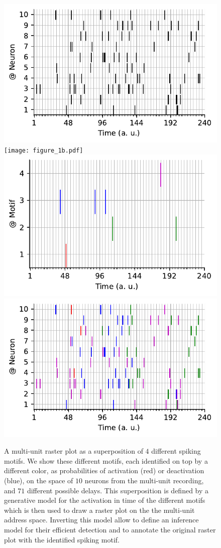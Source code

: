 \documentclass[11pt]{article}
\begin{document}
\begin{figure}[h!]%
    \includegraphics[width=.245\linewidth]{figure_1a_k.pdf}
    \texttt{[image: figure\_1b.pdf]}
  \includegraphics[width=.245\linewidth]{figure_1c.pdf}
    \includegraphics[width=.245\linewidth]{figure_1a.pdf}
{
\caption{A multi-unit raster plot as a superposition of $4$ different spiking motifs. We show these different motifs, each identified on top by a different color, as probabilities of activation (red) or deactivation (blue), on the space of $10$ neurons from the multi-unit recording, and $71$ different possible delays. This superposition is defined by a generative model for the activation in time of the different motifs which is then used to draw a raster plot on the the multi-unit address space. Inverting this model allow to define an inference model for their efficient detection and to annotate the original raster plot with the identified spiking motif.
}
\label{fig:1}
}
\vspace{-5pt}
\end{figure}%
\end{document}
